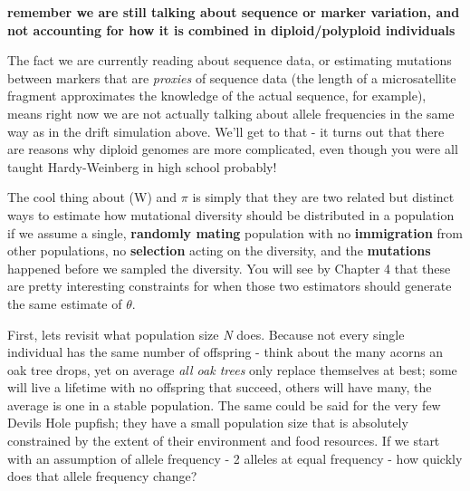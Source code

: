 \documentclass[
]{article}
\begin{document}
\textbf{remember we are still talking about sequence or marker
variation, and not accounting for how it is combined in
diploid/polyploid individuals}

The fact we are currently reading about sequence data, or estimating
mutations between markers that are \emph{proxies} of sequence data (the
length of a microsatellite fragment approximates the knowledge of the
actual sequence, for example), means right now we are not actually
talking about allele frequencies in the same way as in the drift
simulation above. We'll get to that - it turns out that there are
reasons why diploid genomes are more complicated, even though you were
all taught Hardy-Weinberg in high school probably!

The cool thing about (W) and \(\pi\) is simply that they are two related
but distinct ways to estimate how mutational diversity should be
distributed in a population if we assume a single, \textbf{randomly
mating} population with no \textbf{immigration} from other populations,
no \textbf{selection} acting on the diversity, and the
\textbf{mutations} happened before we sampled the diversity. You will
see by Chapter 4 that these are pretty interesting constraints for when
those two estimators should generate the same estimate of \(\theta\).

First, lets revisit what population size \emph{N} does. Because not
every single individual has the same number of offspring - think about
the many acorns an oak tree drops, yet on average \emph{all oak trees}
only replace themselves at best; some will live a lifetime with no
offspring that succeed, others will have many, the average is one in a
stable population. The same could be said for the very few Devils Hole
pupfish; they have a small population size that is absolutely
constrained by the extent of their environment and food resources. If we
start with an assumption of allele frequency - 2 alleles at equal
frequency - how quickly does that allele frequency change?
\end{document}
